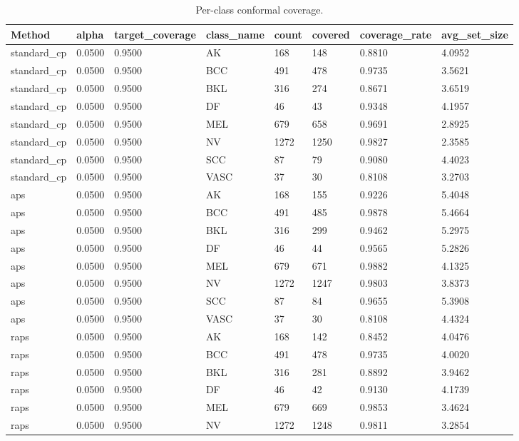 \begin{table}[htbp]
\centering
\caption{Per-class conformal coverage.}
\label{tab:per\_class\_coverage}
\begin{tabular}{llllllll}
\hline
Method & alpha & target\_coverage & class\_name & count & covered & coverage\_rate & avg\_set\_size \\
\hline
standard\_cp & 0.0500 & 0.9500 & AK & 168 & 148 & 0.8810 & 4.0952 \\
standard\_cp & 0.0500 & 0.9500 & BCC & 491 & 478 & 0.9735 & 3.5621 \\
standard\_cp & 0.0500 & 0.9500 & BKL & 316 & 274 & 0.8671 & 3.6519 \\
standard\_cp & 0.0500 & 0.9500 & DF & 46 & 43 & 0.9348 & 4.1957 \\
standard\_cp & 0.0500 & 0.9500 & MEL & 679 & 658 & 0.9691 & 2.8925 \\
standard\_cp & 0.0500 & 0.9500 & NV & 1272 & 1250 & 0.9827 & 2.3585 \\
standard\_cp & 0.0500 & 0.9500 & SCC & 87 & 79 & 0.9080 & 4.4023 \\
standard\_cp & 0.0500 & 0.9500 & VASC & 37 & 30 & 0.8108 & 3.2703 \\
aps & 0.0500 & 0.9500 & AK & 168 & 155 & 0.9226 & 5.4048 \\
aps & 0.0500 & 0.9500 & BCC & 491 & 485 & 0.9878 & 5.4664 \\
aps & 0.0500 & 0.9500 & BKL & 316 & 299 & 0.9462 & 5.2975 \\
aps & 0.0500 & 0.9500 & DF & 46 & 44 & 0.9565 & 5.2826 \\
aps & 0.0500 & 0.9500 & MEL & 679 & 671 & 0.9882 & 4.1325 \\
aps & 0.0500 & 0.9500 & NV & 1272 & 1247 & 0.9803 & 3.8373 \\
aps & 0.0500 & 0.9500 & SCC & 87 & 84 & 0.9655 & 5.3908 \\
aps & 0.0500 & 0.9500 & VASC & 37 & 30 & 0.8108 & 4.4324 \\
raps & 0.0500 & 0.9500 & AK & 168 & 142 & 0.8452 & 4.0476 \\
raps & 0.0500 & 0.9500 & BCC & 491 & 478 & 0.9735 & 4.0020 \\
raps & 0.0500 & 0.9500 & BKL & 316 & 281 & 0.8892 & 3.9462 \\
raps & 0.0500 & 0.9500 & DF & 46 & 42 & 0.9130 & 4.1739 \\
raps & 0.0500 & 0.9500 & MEL & 679 & 669 & 0.9853 & 3.4624 \\
raps & 0.0500 & 0.9500 & NV & 1272 & 1248 & 0.9811 & 3.2854 \\

\end{tabular}
\end{table}
